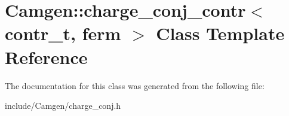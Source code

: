 \hypertarget{a00067}{\section{Camgen\-:\-:charge\-\_\-conj\-\_\-contr$<$ contr\-\_\-t, ferm $>$ Class Template Reference}
\label{a00067}
}


The documentation for this class was generated from the following file\-:\begin{DoxyCompactItemize}
\item 
include/\-Camgen/charge\-\_\-conj.\-h\end{DoxyCompactItemize}
